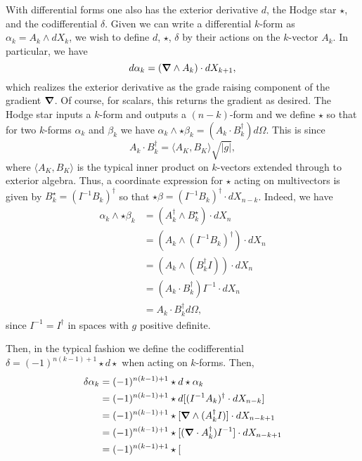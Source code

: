 With differential forms one also has the exterior derivative $d$, the Hodge star $\star$, and the codifferential $\delta$.  Given we can write a differential $k$-form as $\alpha_k = A_k \wedge dX_k$, we wish to define $d$, $\star$, $\delta$ by their actions on the $k$-vector $A_k$.  In particular, we have
\[
d \alpha_k = (\boldsymbol{\nabla} \wedge A_k) \cdot dX_{k+1},
\]
which realizes the exterior derivative as the grade raising component of the gradient $\boldsymbol{\nabla}$. Of course, for scalars, this returns the gradient as desired.  The Hodge star inputs a $k$-form and outputs a $(n-k)$-form and we define $\star$ so that for two $k$-forms $\alpha_k$ and $\beta_k$ we have $\alpha_k \wedge \star \beta_k  = (A_k\cdot B_k^\dagger)d\Omega$.  This is since
\[
A_k \cdot B_k^\dagger = \langle A_{K}, B_{K} \rangle \sqrt{|g|},
\]
where $\langle A_{K}, B_{K} \rangle$ is the typical inner product on $k$-vectors extended through to exterior algebra. Thus, a coordinate expression for $\star$ acting on multivectors is given by $B_k^\star = (I^{-1} B_k)^\dagger$ so that $\star \beta = (I^{-1} B_k)^\dagger \cdot dX_{n-k}$.  Indeed, we have
\begin{align*}
    \alpha_k \wedge \star \beta_k &= (A_k^\dagger \wedge B_k^\star) \cdot dX_n\\
    &= (A_k \wedge (I^{-1}B_k)^\dagger )\cdot dX_n\\
    &= (A_k \wedge (B_k^\dagger I))\cdot dX_n\\
    &= (A_k \cdot B_k^\dagger) I^{-1} \cdot dX_n\\
    &= A_k \cdot B_k^\dagger d\Omega,
\end{align*}
since $I^{-1}=I^\dagger$ in spaces with $g$ positive definite.


Then, in the typical fashion we define the codifferential $\delta = (-1)^{n(k-1)+1} \star d \star$ when acting on $k$-forms.  Then,
\begin{align*}
    \delta \alpha_k &= (-1)^{n(k-1)+1} \star d \star \alpha_k \\
    &= (-1)^{n(k-1)+1} \star d [(I^{-1} A_k)^\dagger  \cdot dX_{n-k}]\\
    &= (-1)^{n(k-1)+1} \star [\boldsymbol{\nabla} \wedge (A_k^\dagger I)] \cdot dX_{n-k+1}\\
    &= (-1)^{n(k-1)+1} \star [(\boldsymbol{\nabla} \cdot A_k^\dagger)I^{-1} ] \cdot dX_{n-k+1}\\
    &= (-1)^{n(k-1)+1} \star [
\end{align*}





